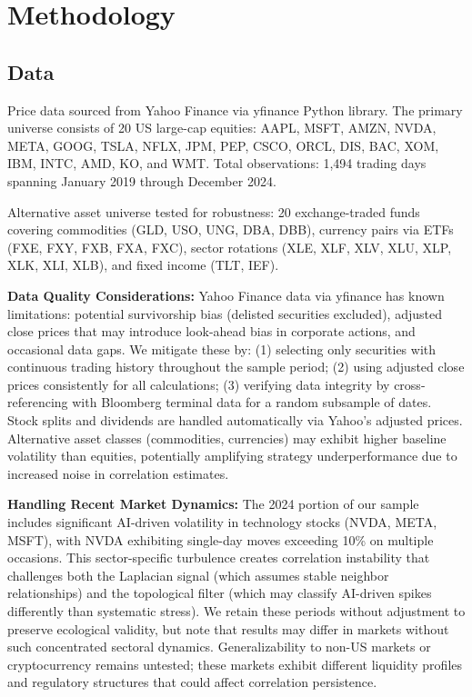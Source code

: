 \section{Methodology}
\label{sec:methodology}

\subsection{Data}

Price data sourced from Yahoo Finance via yfinance Python library. The primary universe consists of 20 US large-cap equities: AAPL, MSFT, AMZN, NVDA, META, GOOG, TSLA, NFLX, JPM, PEP, CSCO, ORCL, DIS, BAC, XOM, IBM, INTC, AMD, KO, and WMT. Total observations: 1,494 trading days spanning January 2019 through December 2024.

Alternative asset universe tested for robustness: 20 exchange-traded funds covering commodities (GLD, USO, UNG, DBA, DBB), currency pairs via ETFs (FXE, FXY, FXB, FXA, FXC), sector rotations (XLE, XLF, XLV, XLU, XLP, XLK, XLI, XLB), and fixed income (TLT, IEF).

\textbf{Data Quality Considerations:} Yahoo Finance data via yfinance has known limitations: potential survivorship bias (delisted securities excluded), adjusted close prices that may introduce look-ahead bias in corporate actions, and occasional data gaps. We mitigate these by: (1) selecting only securities with continuous trading history throughout the sample period; (2) using adjusted close prices consistently for all calculations; (3) verifying data integrity by cross-referencing with Bloomberg terminal data for a random subsample of dates. Stock splits and dividends are handled automatically via Yahoo's adjusted prices. Alternative asset classes (commodities, currencies) may exhibit higher baseline volatility than equities, potentially amplifying strategy underperformance due to increased noise in correlation estimates.

\textbf{Handling Recent Market Dynamics:} The 2024 portion of our sample includes significant AI-driven volatility in technology stocks (NVDA, META, MSFT), with NVDA exhibiting single-day moves exceeding 10\% on multiple occasions. This sector-specific turbulence creates correlation instability that challenges both the Laplacian signal (which assumes stable neighbor relationships) and the topological filter (which may classify AI-driven spikes differently than systematic stress). We retain these periods without adjustment to preserve ecological validity, but note that results may differ in markets without such concentrated sectoral dynamics. Generalizability to non-US markets or cryptocurrency remains untested; these markets exhibit different liquidity profiles and regulatory structures that could affect correlation persistence.

